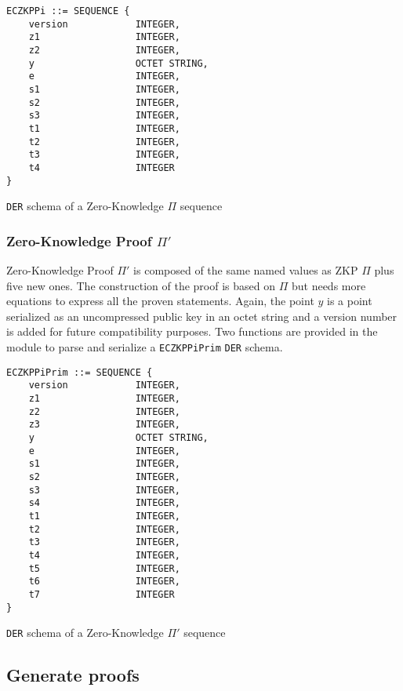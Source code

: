 \begin{listing}
  \begin{verbatim}
ECZKPPi ::= SEQUENCE {
    version            INTEGER,
    z1                 INTEGER,
    z2                 INTEGER,
    y                  OCTET STRING,
    e                  INTEGER,
    s1                 INTEGER,
    s2                 INTEGER,
    s3                 INTEGER,
    t1                 INTEGER,
    t2                 INTEGER,
    t3                 INTEGER,
    t4                 INTEGER
}
  \end{verbatim}
	\caption{\texttt{DER} schema of a Zero-Knowledge $\Pi$ sequence}
	\label{lst:DERSchemaZKPPi}
\end{listing}

\subsubsection{Zero-Knowledge Proof $\Pi'$}

Zero-Knowledge Proof $\Pi'$ is composed of the same named values as ZKP $\Pi$
plus five new ones. The construction of the proof is based on $\Pi$ but needs
more equations to express all the proven statements. Again, the point $y$ is a
point serialized as an uncompressed public key in an octet string and a version
number is added for future compatibility purposes. Two functions are provided in
the module to parse and serialize a \texttt{ECZKPPiPrim} \texttt{DER} schema.

\begin{listing}
  \begin{verbatim}
ECZKPPiPrim ::= SEQUENCE {
    version            INTEGER,
    z1                 INTEGER,
    z2                 INTEGER,
    z3                 INTEGER,
    y                  OCTET STRING,
    e                  INTEGER,
    s1                 INTEGER,
    s2                 INTEGER,
    s3                 INTEGER,
    s4                 INTEGER,
    t1                 INTEGER,
    t2                 INTEGER,
    t3                 INTEGER,
    t4                 INTEGER,
    t5                 INTEGER,
    t6                 INTEGER,
    t7                 INTEGER
}
  \end{verbatim}
	\caption{\texttt{DER} schema of a Zero-Knowledge $\Pi'$ sequence}
	\label{lst:DERSchemaZKPPi2}
\end{listing}

\subsection{Generate proofs}

